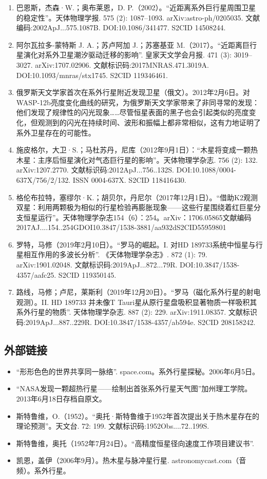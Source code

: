 \begin{enumerate}
\item 巴恩斯，杰森·W.；奥布莱恩，D. P.（2002）。“近距离系外巨行星周围卫星的稳定性”。天体物理学报. 575 (2): 1087–1093. arXiv:astro-ph/0205035. 文献编码:2002ApJ...575.1087B. DOI:10.1086/341477. S2CID 14508244.
\item 阿尔瓦拉多-蒙特斯 J. A.；苏卢阿加 J.；苏塞基亚 M.（2017）。“近距离巨行星演化对系外卫星潮汐驱动迁移的影响”. 皇家天文学会月报. 471 (3): 3019–3027. arXiv:1707.02906. 文献标识码:2017MNRAS.471.3019A. DOI:10.1093/mnras/stx1745. S2CID 119346461.
\item 俄罗斯天文学家首次在系外行星附近发现卫星（俄文）。2012年2月6日。对WASP-12b亮度变化曲线的研究，为俄罗斯天文学家带来了非同寻常的发现：他们发现了规律性的闪光现象……尽管恒星表面的黑子也会引起类似的亮度变化，但观测到的闪光在持续时间、波形和振幅上都非常相似，这有力地证明了系外卫星存在的可能性。
\item 施皮格尔，大卫·S.；马杜苏丹，尼库（2012年9月1日）：“木星将变成一颗热木星：主序后恒星演化对气态巨行星的影响”。天体物理学杂志. 756 (2): 132. arXiv:1207.2770. 文献标识码:2012ApJ...756..132S. DOI:10.1088/0004-637X/756/2/132. ISSN 0004-637X. S2CID 118416430.
\item 格伦布拉特，塞缪尔·K.；胡贝尔，丹尼尔（2017年12月1日）。“借助K2观测双星：利用两颗极为相似的行星检验再膨胀现象——这些行星围绕着红巨星分支恒星运行”。天体物理学杂志154（6）：254。arXiv：1706.05865文献编码2017AJ....154..254GDOI10.3847/1538-3881/aa932dS2CID55959801
\item 罗特，马修（2019年2月10日）。“罗马的崛起。I. 对HD 189733系统中恒星与行星相互作用的多波长分析”. 《天体物理学杂志》. 872 (1): 79. arXiv:1901.02048. 文献标识码:2019ApJ...872...79R. DOI:10.3847/1538-4357/aafc25. S2CID 119350145.
\item 路线，马修；卢尼，莱斯利（2019年12月20日）。“罗马（磁化系外行星的射电观测）。II. HD 189733 并未像T Tauri星从原行星盘吸积显著物质一样吸积其系外行星的物质”. 天体物理学杂志. 887 (2): 229. arXiv:1911.08357. 文献标识码:2019ApJ...887..229R. DOI:10.3847/1538-4357/ab594e. S2CID 208158242.
\end{enumerate}
\subsection{外部链接}
\begin{itemize}
\item “形形色色的世界共享同一脉络”. space.com。系外行星探秘。2006年6月5日。
\item “NASA发现一颗超热行星——绘制出首张系外行星天气图”加州理工学院。2013年6月18日存档自原文。
\item 斯特鲁维，O.（1952）。“奥托·斯特鲁维于1952年首次提出关于热木星存在的理论预测”。天文台. 72: 199. 文献标识码:1952Obs....72..199S.
\item 斯特鲁维，奥托（1952年7月24日）。“高精度恒星径向速度工作项目建议书”.
\item 凯恩，盖伊（2006年9月）。热木星与脉冲星行星. astronomycast.com（音频）。系外行星。
\end{itemize}